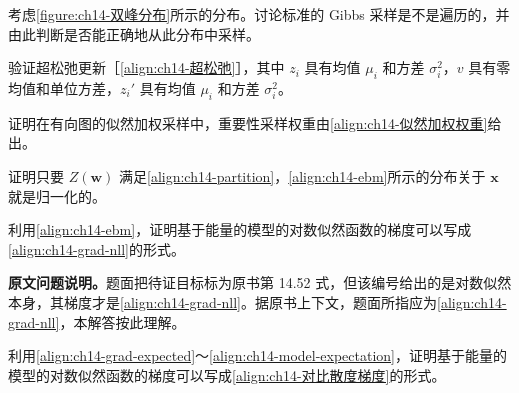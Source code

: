 \documentclass[../../main.tex]{subfiles}
\begin{document}
\begin{exercise}[$\star$]\label{exercise:ch14-13}
考虑\cref{figure:ch14-双峰分布}所示的分布。讨论标准的 Gibbs 采样是不是遍历的，并由此判断是否能正确地从此分布中采样。
\end{exercise}

\begin{exercise}[$\star$]\label{exercise:ch14-14}
验证超松弛更新［\eqref{align:ch14-超松弛}］，其中 $z_{i}$ 具有均值 $\mu_{i}$ 和方差 $\sigma_{i}^{2}$，$v$ 具有零均值和单位方差，$z_{i}'$ 具有均值 $\mu_{i}$ 和方差 $\sigma_{i}^{2}$。
\end{exercise}

\begin{exercise}[$\star$]\label{exercise:ch14-15}
证明在有向图的似然加权采样中，重要性采样权重由\eqref{align:ch14-似然加权权重}给出。
\end{exercise}

\begin{exercise}[$\star$]\label{exercise:ch14-16}
证明只要 $Z(\bm{w})$ 满足\eqref{align:ch14-partition}，\eqref{align:ch14-ebm}所示的分布关于 $\bm{x}$ 就是归一化的。
\end{exercise}

\begin{exercise}[$\star\star$]\label{exercise:ch14-17}
利用\eqref{align:ch14-ebm}，证明基于能量的模型的对数似然函数的梯度可以写成\eqref{align:ch14-grad-nll}的形式。
\end{exercise}

\begin{remark}\textbf{原文问题说明。}题面把待证目标标为原书第 14.52 式，但该编号给出的是对数似然本身，其梯度才是\eqref{align:ch14-grad-nll}。据原书上下文，题面所指应为\eqref{align:ch14-grad-nll}，本解答按此理解。
\end{remark}

\begin{exercise}[$\star\star$]\label{exercise:ch14-18}
利用\eqref{align:ch14-grad-expected}～\eqref{align:ch14-model-expectation}，证明基于能量的模型的对数似然函数的梯度可以写成\eqref{align:ch14-对比散度梯度}的形式。
\end{exercise}
\end{document}
